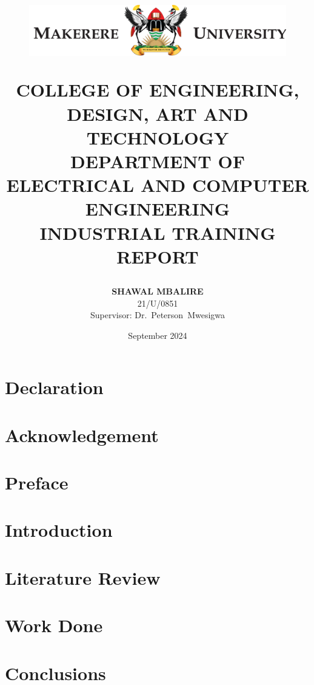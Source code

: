 \documentclass[12pt,a4paper]{report}
\title{
    \begin{figure}[H]
        \centering
        \includegraphics{images/mak_logo.png}
    \end{figure}
    \vspace{20pt}
    \normalsize COLLEGE OF ENGINEERING, DESIGN, ART AND TECHNOLOGY\vspace{15pt}\\
    DEPARTMENT OF ELECTRICAL AND COMPUTER ENGINEERING\\
    \vspace{50pt}
    \textbf{{\large INDUSTRIAL TRAINING REPORT}}
}
\author{
    \normalsize\textbf{SHAWAL MBALIRE} \\
    \normalsize 21/U/0851 \vspace{50pt} \\
    \normalsize Supervisor: Dr.\ Peterson\  Mwesigwa\\
    \vspace{20pt}
}
\date{\normalsize \vspace{40pt} September 2024}
\begin{document}
    \maketitle

    \chapter*{Declaration}
    

    \newpage
    \chapter*{Acknowledgement}
    

    \newpage
    \chapter*{Preface}
    

    \newpage
    \tableofcontents

    \newpage
    \listoffigures

    \newpage
    \listoftables

    \chapter{Introduction}
    


    \newpage
    \chapter{Literature Review}
    

    \newpage
    \chapter{Work Done}
    

    \newpage
    \chapter{Conclusions}
    

    \newpage
    
    
\end{document}
